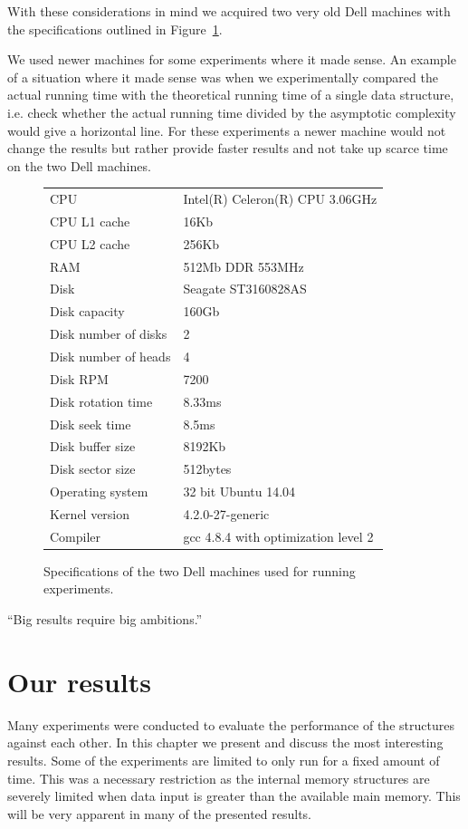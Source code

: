 \documentclass[twoside,11pt,openright]{report}
\begin{document}
With these considerations in mind we acquired two very old Dell machines with the specifications outlined in Figure~\ref{fig:pc_specs}.

We used newer machines for some experiments where it made sense. An example of a situation where it made sense was when we experimentally compared the actual running time with the theoretical running time of a single data structure, i.e. check whether the actual running time divided by the asymptotic complexity would give a horizontal line. For these experiments a newer machine would not change the results but rather provide faster results and not take up scarce time on the two Dell machines.

\begin{figure}[h]
\centering
\begin{tabular}{ll}
CPU & Intel(R) Celeron(R) CPU 3.06GHz \\
CPU L1 cache & 16Kb \\
CPU L2 cache & 256Kb \\
RAM & 512Mb DDR 553MHz \\
Disk & Seagate ST3160828AS \\
Disk capacity & 160Gb \\
Disk number of disks & 2 \\
Disk number of heads & 4 \\
Disk RPM & 7200 \\
Disk rotation time & 8.33ms \\
Disk seek time & 8.5ms \\
Disk buffer size & 8192Kb \\
Disk sector size & 512bytes \\
Operating system & 32 bit Ubuntu 14.04 \\
Kernel version & 4.2.0-27-generic \\
Compiler & gcc 4.8.4 with optimization level 2
\end{tabular}
\caption{Specifications of the two Dell machines used for running experiments.}
\label{fig:pc_specs}
\end{figure}

\begin{savequote}[0.4\textwidth]
``Big results require big ambitions.''
\end{savequote}
\chapter{Our results}
\label{chp:experimental_results}
Many experiments were conducted to evaluate the performance of the structures against each other. In this chapter we present and discuss the most interesting results. Some of the experiments are limited to only run for a fixed amount of time. This was a necessary restriction as the internal memory structures are severely limited when data input is greater than the available main memory. This will be very apparent in many of the presented results.
\end{document}
